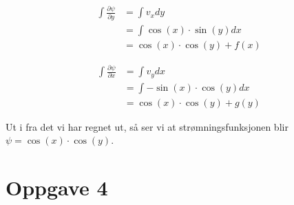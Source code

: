 \documentclass[12pt, a4paper]{article}
\begin{document}
\begin{equation}
    \begin{split}
        \int \frac{\partial \psi}{\partial y} &= \int v_x dy \\
                                              &= \int \cos(x) \cdot \sin(y) dx \\
                                              &= \cos(x) \cdot \cos(y) + f(x)
    \end{split}
\end{equation}

\begin{equation}
    \begin{split}
        \int \frac{\partial \psi}{\partial x} &= \int v_y dx \\
                                              &= \int -\sin(x) \cdot \cos(y) dx \\
                                              &= \cos(x) \cdot \cos(y) + g(y)
    \end{split}
\end{equation}

Ut i fra det vi har regnet ut, så ser vi at strømningsfunksjonen blir $\psi = \cos(x) \cdot \cos(y)$.



\newpage
\section*{Oppgave 4}
\end{document}
